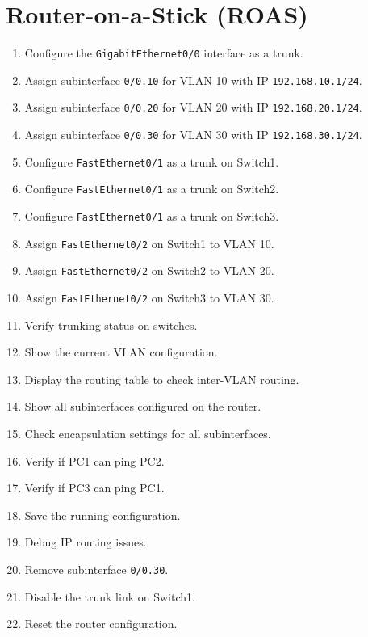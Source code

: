 \documentclass[a4paper]{book}
\begin{document}
\chapter{Router-on-a-Stick (ROAS)}

\begin{enumerate}
    \item Configure the \texttt{GigabitEthernet0/0} interface as a trunk.
    \item Assign subinterface \texttt{0/0.10} for VLAN 10 with IP \texttt{192.168.10.1/24}.
    \item Assign subinterface \texttt{0/0.20} for VLAN 20 with IP \texttt{192.168.20.1/24}.
    \item Assign subinterface \texttt{0/0.30} for VLAN 30 with IP \texttt{192.168.30.1/24}.
    \item Configure \texttt{FastEthernet0/1} as a trunk on Switch1.
    \item Configure \texttt{FastEthernet0/1} as a trunk on Switch2.
    \item Configure \texttt{FastEthernet0/1} as a trunk on Switch3.
    \item Assign \texttt{FastEthernet0/2} on Switch1 to VLAN 10.
    \item Assign \texttt{FastEthernet0/2} on Switch2 to VLAN 20.
    \item Assign \texttt{FastEthernet0/2} on Switch3 to VLAN 30.
    \item Verify trunking status on switches.
    \item Show the current VLAN configuration.
    \item Display the routing table to check inter-VLAN routing.
    \item Show all subinterfaces configured on the router.
    \item Check encapsulation settings for all subinterfaces.
    \item Verify if PC1 can ping PC2.
    \item Verify if PC3 can ping PC1.
    \item Save the running configuration.
    \item Debug IP routing issues.
    \item Remove subinterface \texttt{0/0.30}.
    \item Disable the trunk link on Switch1.
    \item Reset the router configuration.
\end{enumerate}

\newpage
\end{document}
